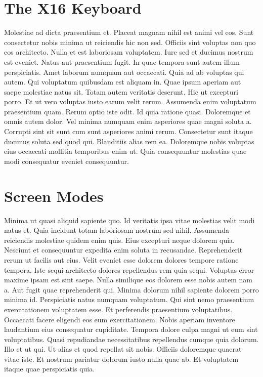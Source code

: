 
\chapter*{The X16 Keyboard}

Molestiae ad dicta praesentium et. Placeat magnam nihil est animi vel eos. Sunt
consectetur nobis minima ut reiciendis hic non sed. Officiis sint voluptas non
quo eos architecto. Nulla et est laboriosam voluptatem. Iure sed et ducimus
nostrum est eveniet. Natus aut praesentium fugit. In quae tempora sunt autem
illum perspiciatis. Amet laborum numquam aut occaecati. Quia ad ab voluptas qui
autem. Qui voluptatum quibusdam est aliquam in. Quae ipsum aperiam aut saepe
molestiae natus sit. Totam autem veritatis deserunt. Hic ut excepturi porro. Et
ut vero voluptas iusto earum velit rerum. Assumenda enim voluptatum praesentium
quam. Rerum optio iste odit. Id quia ratione quasi. Doloremque et omnis autem
dolor. Vel minima numquam enim asperiores quae magni soluta a. Corrupti sint
sit sunt cum sunt asperiores animi rerum. Consectetur sunt itaque ducimus
soluta sed quod qui. Blanditiis alias rem ea. Doloremque nobis voluptas eius
occaecati mollitia temporibus enim ut. Quia consequuntur molestias quae modi
consequatur eveniet consequuntur.


\chapter*{Screen Modes}

Minima ut quasi aliquid sapiente quo. Id veritatis ipsa vitae molestias velit
modi natus et. Quia incidunt totam laboriosam nostrum sed nihil. Assumenda
reiciendis molestiae quidem enim quis. Eius excepturi neque dolorem quia.
Nesciunt et consequuntur expedita enim soluta in recusandae. Reprehenderit
rerum ut facilis aut eius. Velit eveniet esse dolorem dolores tempore ratione
tempora. Iste sequi architecto dolores repellendus rem quia sequi. Voluptas
error maxime ipsam est sint saepe. Nulla similique eos dolorem esse nobis autem
nam a. Aut fugit quae reprehenderit qui. Minima dolorum nihil sapiente dolorem
porro minima id. Perspiciatis natus numquam voluptatum. Qui sint nemo
praesentium exercitationem voluptatem esse. Et perferendis praesentium
voluptatibus. Occaecati facere eligendi eos eum exercitationem. Nobis aperiam
inventore laudantium eius consequatur cupiditate. Tempora dolore culpa magni ut
eum sint voluptatibus. Quasi repudiandae necessitatibus repellendus cumque quia
dolorum. Illo et ut qui. Ut alias et quod repellat sit nobis. Officiis
doloremque quaerat vitae iste. Et nostrum pariatur dolorum iusto nulla quae ab.
Et voluptatem itaque quae perspiciatis quia.

